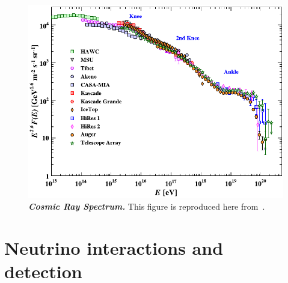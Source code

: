 \begin{figure}
	\centering
	\includegraphics[width=\linewidth]{figures/cosmic_ray_spectrum}
	\internallinenumbers
	\caption{\textbf{\textit{Cosmic Ray Spectrum.}}
		This figure is reproduced here from~\cite{PhysRevD.98.030001}.
	}\label{fig:cosmic_ray_spectrum}
\end{figure}

\section{Neutrino interactions and detection}

